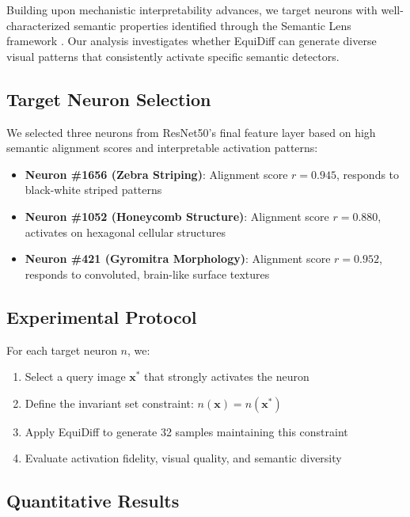 \documentclass[licencjacka,en]{pracamgr}
\newcommand{\method}[1]{EquiDiff}  %
\begin{document}
Building upon mechanistic interpretability advances, we target neurons with well-characterized semantic properties identified through the Semantic Lens framework \citep{dreyer2025mechanisticunderstandingvalidationlarge}. Our analysis investigates whether \method{} can generate diverse visual patterns that consistently activate specific semantic detectors.

\subsection{Target Neuron Selection}

We selected three neurons from ResNet50's final feature layer based on high semantic alignment scores and interpretable activation patterns:

\begin{itemize}
\item \textbf{Neuron \#1656 (Zebra Striping)}: Alignment score $r = 0.945$, responds to black-white striped patterns
\item \textbf{Neuron \#1052 (Honeycomb Structure)}: Alignment score $r = 0.880$, activates on hexagonal cellular structures  
\item \textbf{Neuron \#421 (Gyromitra Morphology)}: Alignment score $r = 0.952$, responds to convoluted, brain-like surface textures
\end{itemize}

\subsection{Experimental Protocol}

For each target neuron $n$, we:
\begin{enumerate}
\item Select a query image $\mathbf{x^*}$ that strongly activates the neuron
\item Define the invariant set constraint: $n(\mathbf{x}) = n(\mathbf{x^*})$
\item Apply \method{} to generate 32 samples maintaining this constraint
\item Evaluate activation fidelity, visual quality, and semantic diversity
\end{enumerate}

\subsection{Quantitative Results}
\end{document}
